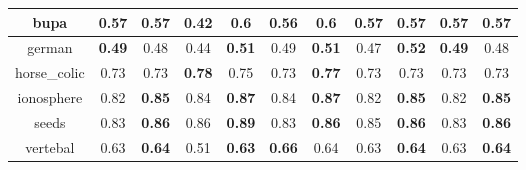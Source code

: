 \documentclass{article}%
\begin{document}
\begin{tabular}{c|cccccccccc}
\hline%
bupa&0.57&0.57&0.42&\textbf{0.6}&0.56&\textbf{0.6}&0.57&0.57&0.57&0.57\\%
\hline%
german&\textbf{0.49}&0.48&0.44&\textbf{0.51}&0.49&\textbf{0.51}&0.47&\textbf{0.52}&\textbf{0.49}&0.48\\%
\hline%
horse\_colic&0.73&0.73&\textbf{0.78}&0.75&0.73&\textbf{0.77}&0.73&0.73&0.73&0.73\\%
\hline%
ionosphere&0.82&\textbf{0.85}&0.84&\textbf{0.87}&0.84&\textbf{0.87}&0.82&\textbf{0.85}&0.82&\textbf{0.85}\\%
\hline%
seeds&0.83&\textbf{0.86}&0.86&\textbf{0.89}&0.83&\textbf{0.86}&0.85&\textbf{0.86}&0.83&\textbf{0.86}\\%
\hline%
vertebal&0.63&\textbf{0.64}&0.51&\textbf{0.63}&\textbf{0.66}&0.64&0.63&\textbf{0.64}&0.63&\textbf{0.64}\\%
\hline%
\end{tabular}

%
\end{document}
